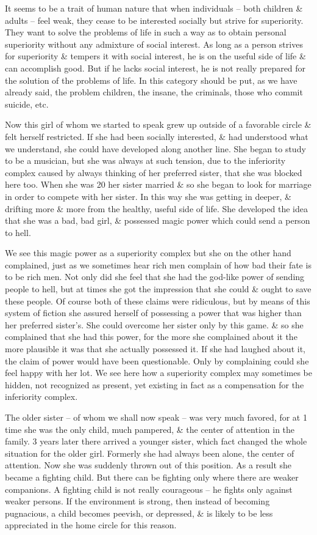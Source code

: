 \documentclass{article}
\begin{document}
It seems to be a trait of human nature that when individuals -- both children \& adults -- feel weak, they cease to be interested socially but strive for superiority. They want to solve the problems of life in such a way as to obtain personal superiority without any admixture of social interest. As long as a person strives for superiority \& tempers it with social interest, he is on the useful side of life \& can accomplish good. But if he lacks social interest, he is not really prepared for the solution of the problems of life. In this category should be put, as we have already said, the problem children, the insane, the criminals, those who commit suicide, etc.

Now this girl of whom we started to speak grew up outside of a favorable circle \& felt herself restricted. If she had been socially interested, \& had understood what we understand, she could have developed along another line. She began to study to be a musician, but she was always at such tension, due to the inferiority complex caused by always thinking of her preferred sister, that she was blocked here too. When she was 20 her sister married \& so she began to look for marriage in order to compete with her sister. In this way she was getting in deeper, \& drifting more \& more from the healthy, useful side of life. She developed the idea that she was a bad, bad girl, \& possessed magic power which could send a person to hell.

We see this magic power as a superiority complex but she on the other hand complained, just as we sometimes hear rich men complain of how bad their fate is to be rich men. Not only did she feel that she had the god-like power of sending people to hell, but at times she got the impression that she could \& ought to save these people. Of course both of these claims were ridiculous, but by means of this system of fiction she assured herself of possessing a power that was higher than her preferred sister's. She could overcome her sister only by this game. \& so she complained that she had this power, for the more she complained about it the more plausible it was that she actually possessed it. If she had laughed about it, the claim of power would have been questionable. Only by complaining could she feel happy with her lot. We see here how a superiority complex may sometimes be hidden, not recognized as present, yet existing in fact as a compensation for the inferiority complex.

The older sister -- of whom we shall now speak -- was very much favored, for at 1 time she was the only child, much pampered, \& the center of attention in the family. 3 years later there arrived a younger sister, which fact changed the whole situation for the older girl. Formerly she had always been alone, the center of attention. Now she was suddenly thrown out of this position. As a result she became a fighting child. But there can be fighting only where there are weaker companions. A fighting child is not really courageous -- he fights only against weaker persons. If the environment is strong, then instead of becoming pugnacious, a child becomes peevish, or depressed, \& is likely to be less appreciated in the home circle for this reason.
\end{document}
